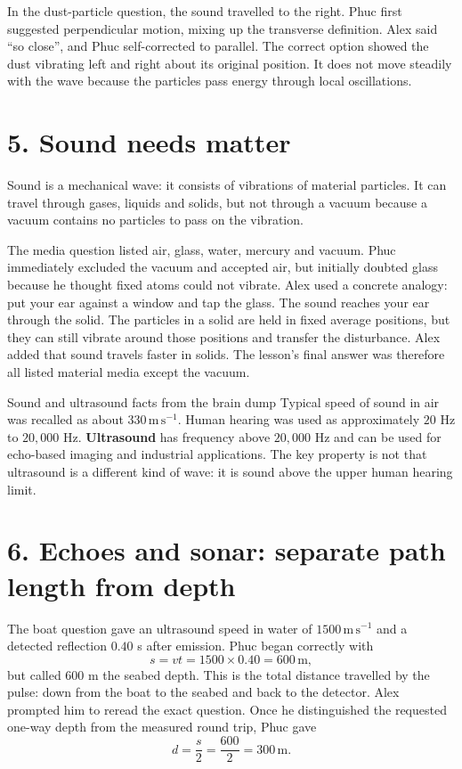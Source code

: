 \documentclass[11pt,a4paper]{article}
\newcommand{\unit}[1]{\,\mathrm{#1}}
\begin{document}
In the dust-particle question, the sound travelled to the right. Phuc first suggested perpendicular motion, mixing up the transverse definition. Alex said ``so close'', and Phuc self-corrected to parallel. The correct option showed the dust vibrating left and right about its original position. It does not move steadily with the wave because the particles pass energy through local oscillations.

\section*{5. Sound needs matter}
Sound is a mechanical wave: it consists of vibrations of material particles. It can travel through gases, liquids and solids, but not through a vacuum because a vacuum contains no particles to pass on the vibration.

The media question listed air, glass, water, mercury and vacuum. Phuc immediately excluded the vacuum and accepted air, but initially doubted glass because he thought fixed atoms could not vibrate. Alex used a concrete analogy: put your ear against a window and tap the glass. The sound reaches your ear through the solid. The particles in a solid are held in fixed average positions, but they can still vibrate around those positions and transfer the disturbance. Alex added that sound travels faster in solids. The lesson's final answer was therefore all listed material media except the vacuum.

\begin{keybox}{Sound and ultrasound facts from the brain dump}
Typical speed of sound in air was recalled as about $330\,\mathrm{m\,s^{-1}}$. Human hearing was used as approximately $20$ Hz to $20{,}000$ Hz. \textbf{Ultrasound} has frequency above $20{,}000$ Hz and can be used for echo-based imaging and industrial applications. The key property is not that ultrasound is a different kind of wave: it is sound above the upper human hearing limit.
\end{keybox}

\section*{6. Echoes and sonar: separate path length from depth}
The boat question gave an ultrasound speed in water of $1500\,\mathrm{m\,s^{-1}}$ and a detected reflection $0.40$ s after emission. Phuc began correctly with
\[
s=vt=1500\times0.40=600\unit{m},
\]
but called $600$ m the seabed depth. This is the total distance travelled by the pulse: down from the boat to the seabed and back to the detector. Alex prompted him to reread the exact question. Once he distinguished the requested one-way depth from the measured round trip, Phuc gave
\[
d=\frac{s}{2}=\frac{600}{2}=300\unit{m}.
\]
\end{document}
